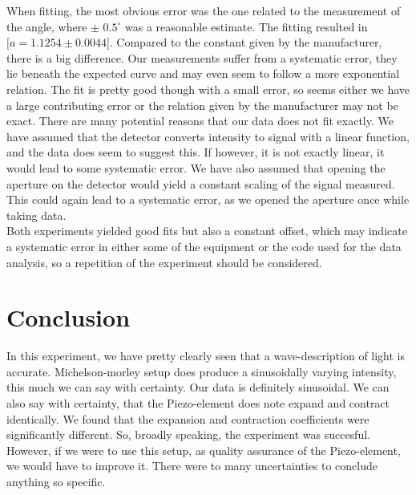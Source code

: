 \documentclass[working, oneside]{inputs/tuftebook}
\begin{document}
When fitting, the most obvious error was the one related to the measurement of the angle, where $\pm$ $0.5^{\circ}$ was a reasonable estimate. The fitting resulted in $[a=1.1254 \pm 0.0044$]. Compared to the constant given by the manufacturer, there is a big difference. Our measurements suffer from a systematic error, they lie beneath the expected curve and may even seem to follow a more exponential relation. The fit is pretty good though with a small error, so seems either we have a large contributing error or the relation given by the manufacturer may not be exact. There are many potential reasons that our data does not fit exactly. We have assumed that the detector converts intensity to signal with a linear function, and the data does seem to suggest this. If however, it is not exactly linear, it would lead to some systematic error. We have also assumed that opening the aperture on the detector would yield a constant scaling of the signal measured. This could again lead to a systematic error, as we opened the aperture once while taking data. 
\\
Both experiments yielded good fits but also a constant offset, which may indicate a systematic error in either some of the equipment or the code used for the data analysis, so a repetition of the experiment should be considered.
\section*{Conclusion}
In this experiment, we have pretty clearly seen that a wave-description of light is accurate. Michelson-morley setup does produce a sinusoidally varying intensity, this much we can say with certainty. Our data is definitely sinusoidal. We can also say with certainty, that the Piezo-element does note expand and contract identically. We found that the expansion and contraction coefficients were significantly different. So, broadly speaking, the experiment was succesful. However, if we were to use this setup, as quality assurance of the Piezo-element, we would have to improve it. There were to many uncertainties to conclude anything so specific.
\printbibliography
\end{document}
